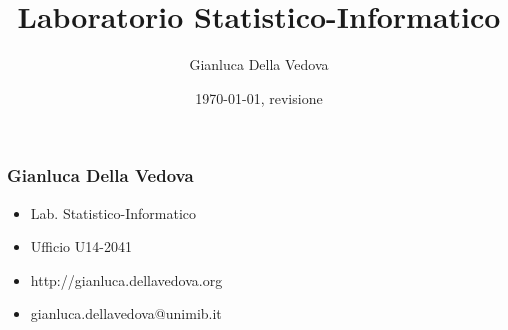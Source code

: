\usepackage[italian]{babel}
\usepackage[utf8]{inputenc}
\usepackage{pgf}
\usepackage{verbatim}

\usepackage[T1]{fontenc}

\immediate{}


\author{Gianluca Della Vedova}
\title{Laboratorio Statistico-Informatico}
\date{\today, {\tiny revisione \VCRevision}}






\begin{frame}
  \titlepage
\end{frame}


\begin{frame}\frametitle{Gianluca Della Vedova}
  \begin{itemize}
  \item
    Lab. Statistico-Informatico
  \item
    Ufficio U14-2041
  \item
    \textsf{\small http://gianluca.dellavedova.org}
  \item
    \textsf{\small gianluca.dellavedova@unimib.it}
  \end{itemize}
\end{frame}





